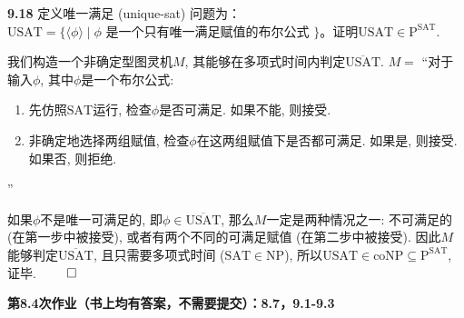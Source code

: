 \documentclass[UTF8]{report}
\renewcommand{\P}{\mathbb{P}} %
\newcommand{\problem}[1]{{\setlength{\parskip}{10pt}\noindent \bf{#1}}}
\renewenvironment{proof}{{\setlength{\parskip}{7pt}\noindent\hskip 2em \bf 证明 \quad}}{\hfill$\qed$\par}
\newcommand{\NP}{\mathrm{NP}}
\newcommand{\coNP}{\mathrm{coNP}}
\newcommand{\SAT}{\mathrm{SAT}}
\newcommand{\USAT}{\mathrm{USAT}}
\renewcommand{\P}{\mathrm{P}}
\begin{document}
\problem{9.18} 定义唯一满足 (unique-sat) 问题为： $\USAT = \{ \langle \phi \rangle \mid \phi \text{ 是一个只有唯一满足赋值的布尔公式 } \}$。证明$\USAT \in \P^{\SAT}$.

\begin{proof}
    我们构造一个非确定型图灵机$M$, 其能够在多项式时间内判定$\overline{\USAT}$. $M =$ ``对于输入$\phi$, 其中$\phi$是一个布尔公式:
    \begin{enumerate}
        \item 先仿照$\SAT$运行, 检查$\phi$是否可满足. 如果不能, 则接受.
        \item 非确定地选择两组赋值, 检查$\phi$在这两组赋值下是否都可满足. 如果是, 则接受. 如果否, 则拒绝.
    \end{enumerate}
    ''

    如果$\phi$不是唯一可满足的, 即$\phi \in \overline{\USAT}$, 那么$M$一定是两种情况之一: 不可满足的 (在第一步中被接受), 或者有两个不同的可满足赋值 (在第二步中被接受). 因此$M$能够判定$\overline{\USAT}$, 且只需要多项式时间 ($\SAT \in \NP$), 所以$\USAT \in \coNP \subseteq \P^{\SAT}$, 证毕.
\end{proof}



\textbf{第8.4次作业（书上均有答案，不需要提交）：8.7，9.1-9.3}
\end{document}
